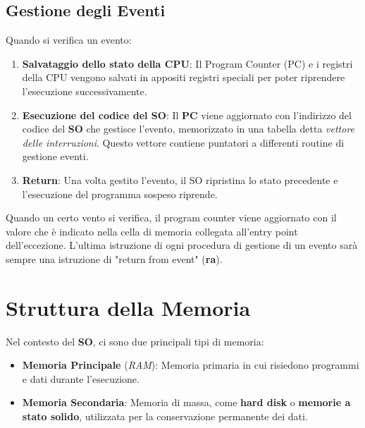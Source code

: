 \subsection{Gestione degli Eventi}
Quando si verifica un evento:
\begin{enumerate}
    \item \textbf{Salvataggio dello stato della CPU}: Il Program Counter (PC) e i registri della CPU vengono salvati in appositi registri speciali per poter riprendere l'esecuzione successivamente.
    \item \textbf{Esecuzione del codice del SO}: Il \textbf{PC} viene aggiornato con l'indirizzo del codice del \textbf{SO} che gestisce l'evento, memorizzato in una tabella detta \textit{vettore delle interruzioni}. Questo vettore contiene puntatori a differenti routine di gestione eventi.
    \item \textbf{Return}: Una volta gestito l'evento, il SO ripristina lo stato precedente e l'esecuzione del programma sospeso riprende.
\end{enumerate}
Quando un certo vento si verifica, il program counter viene aggiornato con il valore che è indicato nella cella di memoria collegata all'entry point dell'eccezione.
L'ultima istruzione di ogni procedura di gestione di un evento sarà sempre una istruzione di "return from event" (\textbf{ra}).



\section{Struttura della Memoria}
Nel contesto del \textbf{SO}, ci sono due principali tipi di memoria:
\begin{itemize}
    \item \textbf{Memoria Principale} (\textit{RAM}): Memoria primaria in cui risiedono programmi e dati durante l'esecuzione.
    \item \textbf{Memoria Secondaria}: Memoria di massa, come \textbf{hard disk} o \textbf{memorie a stato solido}, utilizzata per la conservazione permanente dei dati.
\end{itemize}

